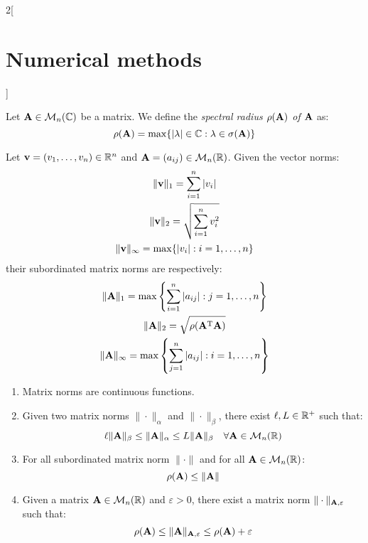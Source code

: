 \documentclass[../../../main.tex]{subfiles}
\begin{document}
\begin{multicols}{2}[\section{Numerical methods}]
\begin{definition}
        Let $\vb{A}\in\mathcal{M}_n(\mathbb{C})$ be a matrix. We define the \textit{spectral radius $\rho(\vb{A})$ of $\vb{A}$} as: $$\rho(\vb{A})=\max\{|\lambda|\in\mathbb{C}:\lambda\in\sigma(\vb{A})\}$$
    \end{definition}
    \begin{prop}
        Let $\vb{v}=(v_1,\ldots,v_n)\in\mathbb{R}^n$ and $\vb{A}=(a_{ij})\in\mathcal{M}_n(\mathbb{R})$. Given the vector norms:
        \begin{gather*}
            \|\vb{v}\|_1=\sum_{i=1}^n|v_i|\\
            \|\vb{v}\|_2=\sqrt{\sum_{i=1}^nv_i^2}\\
            \|\vb{v}\|_\infty=\max\{|v_i|:i=1,\ldots,n\}
        \end{gather*}
        their subordinated matrix norms are respectively:
        \begin{gather*}
            \|\vb{A}\|_1=\max\left\{\sum_{i=1}^n|a_{ij}|:j=1,\ldots,n\right\}\\
            \|\vb{A}\|_2=\sqrt{\rho(\vb{A}^{\mathrm{T}}\vb{A})}\\
            \|\vb{A}\|_\infty=\max\left\{\sum_{j=1}^n|a_{ij}|:i=1,\ldots,n\right\}
        \end{gather*}
    \end{prop}
    \begin{prop}
        \hfill
        \begin{enumerate}
            \item Matrix norms are continuous functions.
            \item Given two matrix norms $\|\cdot\|_\alpha$ and $\|\cdot\|_\beta$, there exist $\ell, L\in\mathbb{R}^+$ such that: $$\ell \|\vb{A}\|_\beta\leq\|\vb{A}\|_\alpha\leq L\|\vb{A}\|_\beta\quad\forall\vb{A}\in\mathcal{M}_n(\mathbb{R})$$
            \item For all subordinated matrix norm $\|\cdot\|$ and for all $\vb{A}\in\mathcal{M}_n(\mathbb{R})$: $$\rho(\vb{A})\leq\|\vb{A}\|$$
            \item Given a matrix $\vb{A}\in\mathcal{M}_n(\mathbb{R})$ and $\varepsilon>0$, there exist a matrix norm $\|\cdot\|_{\vb{A},\varepsilon}$ such that: $$\rho(\vb{A})\leq\|\vb{A}\|_{\vb{A},\varepsilon}\leq\rho(\vb{A})+\varepsilon$$
        \end{enumerate}
    \end{prop}

\end{multicols}
\end{document}
